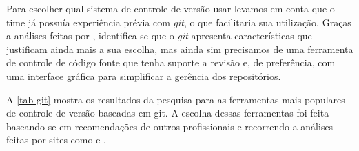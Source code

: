 \documentclass[
	12pt,				%
	openright,			%
	oneside,			%
	a4paper,			%
	english,			%
	french,				%
	spanish,			%
	brazil,				%
	]{abntex2}
\begin{document}
Para escolher qual sistema de controle de versão usar levamos em conta que o time já possuía experiência prévia com \textit{git}, o que facilitaria sua utilização. Graças a análises feitas por , identifica-se que o \textit{git} apresenta características que justificam ainda mais a sua escolha, mas ainda sim precisamos de uma ferramenta de controle de código fonte que tenha suporte a revisão e, de preferência, com uma interface gráfica para simplificar a gerência dos repositórios.

A \autoref{tab-git} mostra os resultados da pesquisa para as ferramentas mais populares de controle de versão baseadas em git. A escolha dessas ferramentas foi feita baseando-se em recomendações de outros profissionais e recorrendo a análises feitas por sites como  e .
\end{document}
